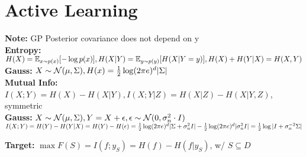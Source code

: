\begin{comment}
	\pagebreak
\end{comment}

\section{Active Learning}
\begin{comment}
	We can model the uncertainty with previously discussed methods, and we can categorise them into aleatoric and epistemic uncertainty.
	The topic is now how to make decisions based on this uncertainty.\\
	\textbf{Active Learning:} Algorithm learns where samples should be taken. Makes sense when attaining samples is expensive. Often we have a collection of unlabeled datapoints, where do we want to aquire a label?\\
\end{comment}

\textbf{Note:} GP Posterior covariance does not depend on y\\

\textbf{Entropy:} $H(X) = \mathbb{E}_{x \sim p(x)}[-\log p(x)], 
H(X|Y)\\ = \mathbb{E}_{y \sim p(y)}[H(X|Y=y)],
H(X) + H(Y|X) = H(X,Y)$\\
\textbf{Gauss:} $X \sim \mathcal{N}(\mu, \Sigma), H(x) = \frac{1}{2}\log(2\pi e)^d |\Sigma|$\\
\textbf{Mutual Info:} $I(X;Y) = H(X)-H(X|Y),
I(X; Y|Z) = H(X|Z) - H(X| Y,Z)$, symmetric\\

\textbf{Gauss:} $X \sim \mathcal{N}(\mu, \Sigma), Y = X + \epsilon, \epsilon \sim \mathcal{N}(0, \sigma_n^2 \cdot I)$\\
$I(X;Y) = H(Y) - H(Y|X) = H(Y) - H(\epsilon) \\
= \frac{1}{2} \log(2 \pi e)^d |\Sigma + \sigma_n^2I| - \frac{1}{2} \log(2 \pi e)^d |\sigma_n^2I| 
= \frac{1}{2} \log |I + \sigma_n^{-2} \Sigma|$
\begin{comment}
	If we have a dependent variable, we see by this example that we don't gain a lot of information.\\
\end{comment}

\textbf{Target:} $\max F(S) = I(f;y_S) = H(f) - H(f|y_S)$, w/ $S \subseteq D$\\
\begin{comment}
	We want to find a subset of points which maximises the information we gain on the function f. If we deal with Gaussians, we can use the formula above.\\
	This is only one way to define utility.\\
\end{comment}

